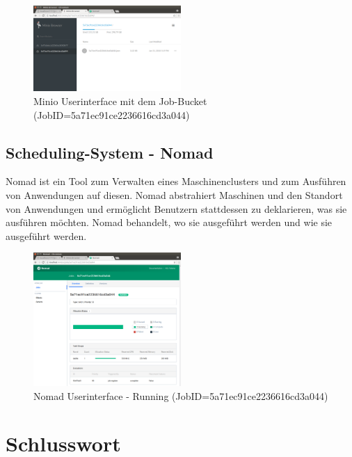 \documentclass[12pt]{article}
\begin{document}
\begin{figure}[h!]
  \centering
  \includegraphics[width=0.5\textwidth]{images/jobbucket_05.png}
  \caption{Minio Userinterface mit dem Job-Bucket (JobID=5a71ec91ce2236616cd3a044)}
  \label{}
\end{figure}

\subsection{Scheduling-System - Nomad }

Nomad \cite{NOMAD} ist ein Tool zum Verwalten eines Maschinenclusters und zum Ausführen von Anwendungen auf diesen. Nomad abstrahiert Maschinen und den Standort von Anwendungen und ermöglicht Benutzern stattdessen zu deklarieren, was sie ausführen möchten. Nomad behandelt, wo sie ausgeführt werden und wie sie ausgeführt werden.

\begin{figure}[h!]
  \centering
  \includegraphics[width=0.5\textwidth]{images/jobrunning_04.png}
  \caption{Nomad Userinterface - Running (JobID=5a71ec91ce2236616cd3a044)}
  \label{}
\end{figure}

\newpage


\section{Schlusswort}
\end{document}
